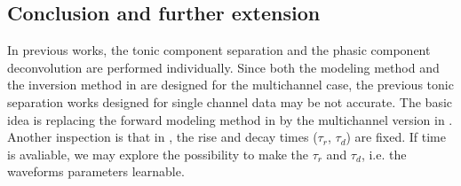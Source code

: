 \documentclass[10pt,conference]{ieeeconf}
\begin{document}
\subsection{Conclusion and further extension}

In previous works, the tonic component separation and the phasic component deconvolution are performed individually. Since both the modeling method and the inversion method in \cite{amin2019robust} are designed for the multichannel case, the previous tonic separation works designed for single channel data may be not accurate. The basic idea is replacing the forward modeling method in \cite{amin2019tonic} by the multichannel version in \cite{amin2019robust}. Another inspection is that in \cite{amin2019robust}, the rise and decay times ($\tau_r$, $\tau_d$) are fixed. If time is avaliable, we may explore the possibility to make the $\tau_r$ and $\tau_d$, i.e. the waveforms parameters learnable.



\end{document}
